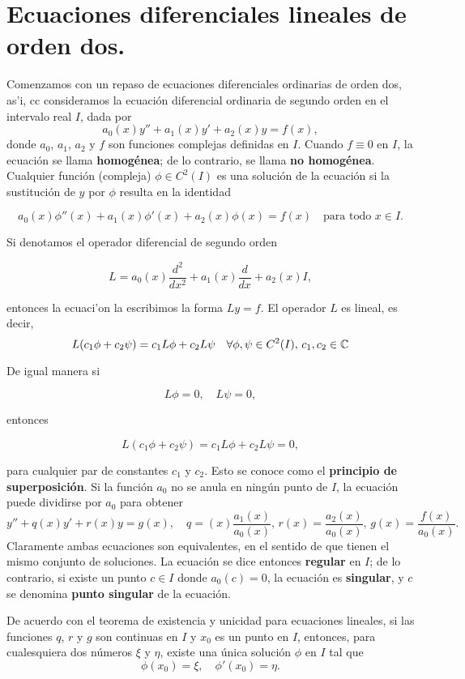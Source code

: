 \documentclass[main.tex]{subfiles}
\begin{document}
\section{Ecuaciones diferenciales lineales de orden dos.}
\noindent Comenzamos con un repaso de ecuaciones diferenciales ordinarias de orden dos, as'i, cc consideramos la ecuación diferencial ordinaria de segundo orden en el intervalo real \( I \), dada por
\[
a_0(x) y'' + a_1(x) y' + a_2(x) y = f(x),
\]
donde \( a_0 \), \( a_1 \), \( a_2 \) y \( f \) son funciones complejas definidas en \(I\). Cuando \(f\equiv 0\) en \(I\), la ecuación se llama \textbf{homogénea}; de lo contrario, se llama \textbf{no homogénea}. Cualquier función (compleja) \(\phi \in C^2(I)\) es una solución de la ecuación si la sustitución de \(y\) por \(\phi\) resulta en la identidad

\[
a_0(x) \phi''(x) + a_1(x) \phi'(x) + a_2(x) \phi(x) = f(x) \quad \text{para todo } x \in I.
\]

Si denotamos el operador diferencial de segundo orden

\[
L = a_0(x) \frac{d^2}{dx^2} + a_1(x) \frac{d}{dx} + a_2(x)I,
\]

entonces la ecuaci'on la escribimos la forma \(Ly= f\). El operador \(L\) es lineal, es decir,
\[
L(c_1 \phi + c_2 \psi) = c_1 L\phi + c_2 L\psi\quad\forall \phi, \psi \in C^2(I),\,c_1,c_2 \in\mathbb C 
\]

De igual manera si

\[
L\phi = 0, \quad L\psi = 0,
\]

entonces

\[
L(c_1 \phi + c_2 \psi) = c_1 L\phi + c_2 L\psi = 0,
\]

para cualquier par de constantes \( c_1 \) y \( c_2 \). Esto se conoce como el \textbf{principio de superposición}.
Si la función \(a_0\) no se anula en ningún punto de \(I\), la ecuación puede dividirse por \(a_0\) para obtener
\[
y'' + q(x) y' + r(x) y = g(x),\quad q=(x)\frac{a_1(x)}{a_0(x)},\,r(x)=\frac{a_2(x)}{a_0(x)},\,g(x)=\frac{f(x)}{a_0(x)}.
\]
Claramente ambas ecuaciones son equivalentes, en el sentido de que tienen el mismo conjunto de soluciones. La ecuación se dice entonces \textbf{regular} en \(I\); de lo contrario, si existe un punto \( c \in I \) donde \( a_0(c) = 0 \), la ecuación es \textbf{singular}, y \(c\) se denomina \textbf{punto singular} de la ecuación.

De acuerdo con el teorema de existencia y unicidad para ecuaciones lineales, si las funciones \(q\), \(r\) y \(g\) son continuas en \(I\) y \(x_0\) es un punto en \(I\), entonces, para cualesquiera dos números \(\xi\) y \(\eta\), existe una única solución \( \phi \) en \( I \) tal que
\[
\phi(x_0) = \xi, \quad \phi'(x_0) = \eta.
\]
\end{document}
